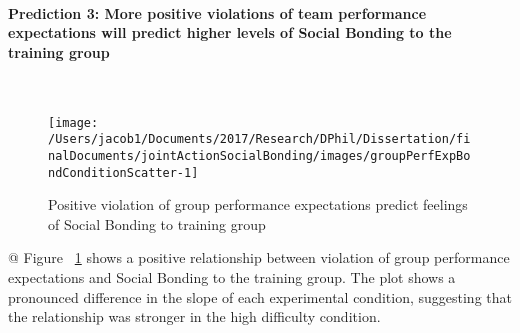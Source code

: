 \documentclass[english]{article}\usepackage[]{graphicx}\usepackage[]{color}
\makeatletter
\def\maxwidth{ %
  \ifdim\Gin@nat@width>\linewidth
    \linewidth
  \else
    \Gin@nat@width
  \fi
}
\newenvironment{kframe}{%
 \def\at@end@of@kframe{}%
 \ifinner\ifhmode%
  \def\at@end@of@kframe{\end{minipage}}%
  \begin{minipage}{\columnwidth}%
 \fi\fi%
 \def\FrameCommand##1{\hskip\@totalleftmargin \hskip-\fboxsep
 \colorbox{shadecolor}{##1}\hskip-\fboxsep
     \hskip-\linewidth \hskip-\@totalleftmargin \hskip\columnwidth}%
 \MakeFramed {\advance\hsize-\width
   \@totalleftmargin\z@ \linewidth\hsize
   \@setminipage}}%
 {\par\unskip\endMakeFramed%
 \at@end@of@kframe}
\newenvironment{knitrout}{}{} %
\newcommand{\myparagraph}[1]{\paragraph{#1}\mbox{}\\}
\makeatother
\begin{document}
\myparagraph{Prediction 3: More positive violations of team performance expectations will predict higher levels of Social Bonding to the training group}


\begin{knitrout}
\color{fgcolor}\begin{kframe}


{\ttfamily\noindent\color{warningcolor}{\#\# Warning: Removed 1 rows containing non-finite values (stat\_smooth).}}

{\ttfamily\noindent\color{warningcolor}{\#\# Warning: Removed 1 rows containing missing values (geom\_point).}}\end{kframe}\begin{figure}

{\centering \texttt{[image: /Users/jacob1/Documents/2017/Research/DPhil/Dissertation/finalDocuments/jointActionSocialBonding/images/groupPerfExpBondConditionScatter-1]} 

}

\caption[Positive violation of group performance expectations 
 predict feelings of Social Bonding to training group]{Positive violation of group performance expectations 
 predict feelings of Social Bonding to training group}\label{fig:groupPerfExpBondConditionScatter}
\end{figure}

\begin{kframe}

{\ttfamily\noindent\itshape\color{messagecolor}{\#\# Saving 3.5 x 3.5 in image}}

{\ttfamily\noindent\color{warningcolor}{\#\# Warning: Removed 1 rows containing non-finite values (stat\_smooth).}}

{\ttfamily\noindent\color{warningcolor}{\#\# Warning: Removed 1 rows containing missing values (geom\_point).}}\end{kframe}
\end{knitrout}

@
Figure ~\ref{fig:groupPerfExpBondConditionScatter} shows a positive relationship between violation of group performance expectations and Social Bonding to the training group.  The plot shows a pronounced difference in the slope of each experimental condition, suggesting that the relationship was stronger in the high difficulty condition.
\end{document}
